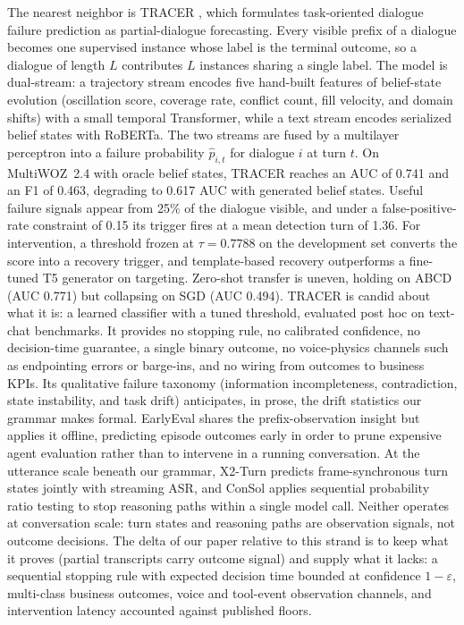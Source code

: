 The nearest neighbor is TRACER \citep{nourbakhsh2026tracer}, which formulates task-oriented dialogue failure prediction as partial-dialogue forecasting.
Every visible prefix of a dialogue becomes one supervised instance whose label is the terminal outcome, so a dialogue of length $L$ contributes $L$ instances sharing a single label.
The model is dual-stream: a trajectory stream encodes five hand-built features of belief-state evolution (oscillation score, coverage rate, conflict count, fill velocity, and domain shifts) with a small temporal Transformer, while a text stream encodes serialized belief states with RoBERTa.
The two streams are fused by a multilayer perceptron into a failure probability $\hat{p}_{i,t}$ for dialogue $i$ at turn $t$.
On MultiWOZ~2.4 with oracle belief states, TRACER reaches an AUC of 0.741 and an F1 of 0.463, degrading to 0.617 AUC with generated belief states.
Useful failure signals appear from 25\% of the dialogue visible, and under a false-positive-rate constraint of 0.15 its trigger fires at a mean detection turn of 1.36.
For intervention, a threshold frozen at $\tau = 0.7788$ on the development set converts the score into a recovery trigger, and template-based recovery outperforms a fine-tuned T5 generator on targeting.
Zero-shot transfer is uneven, holding on ABCD (AUC 0.771) but collapsing on SGD (AUC 0.494).
TRACER is candid about what it is: a learned classifier with a tuned threshold, evaluated post hoc on text-chat benchmarks.
It provides no stopping rule, no calibrated confidence, no decision-time guarantee, a single binary outcome, no voice-physics channels such as endpointing errors or barge-ins, and no wiring from outcomes to business KPIs.
Its qualitative failure taxonomy (information incompleteness, contradiction, state instability, and task drift) anticipates, in prose, the drift statistics our grammar makes formal.
EarlyEval \citep{earlyeval2026} shares the prefix-observation insight but applies it offline, predicting episode outcomes early in order to prune expensive agent evaluation rather than to intervene in a running conversation.
At the utterance scale beneath our grammar, X2-Turn \citep{x2turn2026} predicts frame-synchronous turn states jointly with streaming ASR, and ConSol \citep{consol2025} applies sequential probability ratio testing to stop reasoning paths within a single model call.
Neither operates at conversation scale: turn states and reasoning paths are observation signals, not outcome decisions.
The delta of our paper relative to this strand is to keep what it proves (partial transcripts carry outcome signal) and supply what it lacks: a sequential stopping rule with expected decision time bounded at confidence $1-\varepsilon$, multi-class business outcomes, voice and tool-event observation channels, and intervention latency accounted against published floors.

